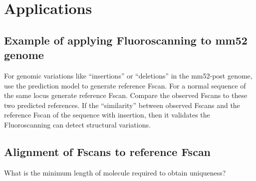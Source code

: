 \section{Applications}

\subsection{Example of applying Fluoroscanning to mm52 genome}
For genomic variations like ``insertions'' or ``deletions'' in the mm52-post genome, use the prediction model to generate reference Fscan. For a normal sequence of the same locus generate reference Fscan. Compare the observed Fscans to these two predicted references. If the ``similarity'' between observed Fscans and the reference Fscan of the sequence with insertion, then it validates the Fluoroscanning can detect structural variations.

\vspace{2in}
\subsection{Alignment of Fscans to reference Fscan}
What is the minimum length of molecule required to obtain uniqueness?


